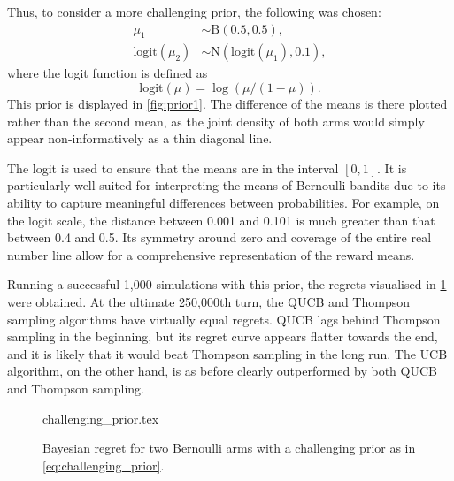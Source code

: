 Thus, to consider a more challenging prior, the following was chosen:
\begin{equation}
    \label{eq:challenging_prior}
    \begin{aligned}
        \mu_1               & \sim \text{B}(0.5, 0.5),                 \\
        \text{logit}(\mu_2) & \sim \text{N}(\text{logit}(\mu_1), 0.1),
    \end{aligned}
\end{equation}
where the logit function is defined as
\begin{equation}
    \label{eq:logit}
    \text{logit}(\mu) = \log(\mu/(1-\mu)).
\end{equation}
This prior is displayed in \cref{fig:prior1}.
The difference of the means is there plotted rather than the second mean, as the joint density of both arms would simply appear non-informatively as a thin diagonal line.

The logit is used to ensure that the means are in the interval $[0, 1]$.
It is particularly well-suited for interpreting the means of Bernoulli bandits due to its ability to capture meaningful differences between probabilities. For example, on the logit scale, the distance between 0.001 and 0.101 is much greater than that between 0.4 and 0.5.
Its symmetry around zero and coverage of the entire real number line allow for a comprehensive representation of the reward means.



Running a successful 1,000 simulations with this prior, the regrets visualised in \cref{fig:random2} were obtained.
At the ultimate 250,000th turn, the QUCB and Thompson sampling algorithms have virtually equal regrets.
QUCB lags behind Thompson sampling in the beginning, but its regret curve appears flatter towards the end, and it is likely that it would beat Thompson sampling in the long run.
The UCB algorithm, on the other hand, is as before clearly outperformed by both QUCB and Thompson sampling.

\begin{figure}[p]
    \centering
    \newcommand{\myoptions}{
        width=10cm,
        height=8cm,
        xlabel={Kiloturn},
        ylabel={Regret},
        legend entries={Baseline, UCB, QUCB, Thompson},
        legend pos=north west,
        legend cell align=left,
        mystyle,
        ymax = 400,
    }
    {challenging_prior.tex}
    \caption[
        Bayesian regret for two Bernoulli arms, challenging prior.
    ]
    {
        Bayesian regret for two Bernoulli arms with a challenging prior as in \cref{eq:challenging_prior}.
    }
    \label{fig:random2}
\end{figure}

